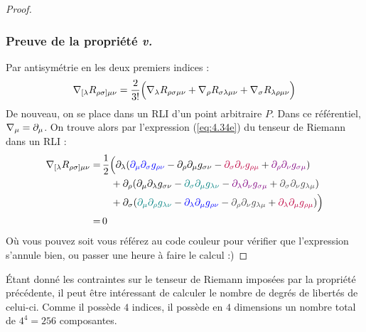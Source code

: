 \begin{proof}
    \subsubsection{Preuve de la propriété \emph{v.}}
        Par antisymétrie en les deux premiers indices :
        \begin{equation}
            \nabla_{[\lambda}R_{\rho \sigma]\mu \nu} = \frac{2}{3!} \Bigl(\nabla_{\lambda}R_{\rho \sigma \mu \nu} + \nabla_{\rho}R_{\sigma \lambda \mu \nu} + \nabla_{\sigma}R_{\lambda \rho \mu \nu}\Bigr)
        \end{equation}
        De nouveau, on se place dans un RLI d'un point arbitraire $P$. Dans ce référentiel, $\nabla_\mu = \partial_\mu$. On trouve alors par l'expression (\ref{eq:4.34e}) du tenseur de Riemann dans un RLI :
        \begin{align}
            \nabla_{[\lambda}R_{\rho \sigma]\mu \nu} =&\, \frac{1}{2}\Bigl(\partial_{\lambda}(\textcolor{blue}{\partial_{\mu}\partial_{\sigma}g_{\rho \nu}} - \partial_{\rho}\partial_{\mu}g_{\sigma \nu} - \textcolor{purple}{\partial_{\sigma}\partial_{\nu}g_{\rho \mu}} + \textcolor{violet}{\partial_{\rho}\partial_{\nu}g_{\sigma \mu}}) \\
            & \quad+ \partial_{\rho}(\partial_{\mu}\partial_{\lambda}g_{\sigma \nu} - \textcolor{teal}{\partial_{\sigma}\partial_{\mu}g_{\lambda \nu}} - \textcolor{violet}{\partial_{\lambda}\partial_{\nu}g_{\sigma \mu} }
            + \textcolor{darkgray}{\partial_{\sigma}\partial_{\nu}g_{\lambda \mu}}) \\
            & \quad+\partial_{\sigma}(\textcolor{teal}{\partial_{\mu}\partial_{\rho}g_{\lambda \nu}} - \textcolor{blue}{\partial_{\lambda}\partial_{\mu}g_{\rho \nu}} - \textcolor{darkgray}{\partial_{\rho}\partial_{\nu}g_{\lambda \mu}} + \textcolor{purple}{\partial_{\lambda}\partial_{\mu}g_{\rho \mu}})\Bigr)\\
            =& \,0
        \end{align}
        Où vous pouvez soit vous référez au code couleur pour vérifier que l'expression s'annule bien, ou passer une heure à faire le calcul :)
\end{proof}
Étant donné les contraintes sur le tenseur de Riemann imposées par la propriété précédente, il peut être intéressant de calculer le nombre de degrés de libertés de celui-ci. Comme il possède $4$ indices, il possède en $4$ dimensions un nombre total de $4^4 = 256$ composantes. 

